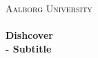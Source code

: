 \begin{titlingpage}\centering

\textsc{\LARGE Aalborg University}\\[0.3cm]

\HRule \\[0.4cm]
{\huge \bfseries Dishcover}\\[0.5cm]
{\Large \bfseries - Subtitle}

\HRule \\[2cm]

\begin{minipage}{\columnwidth}
\end{minipage}


\end{titlingpage}
